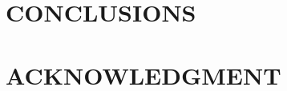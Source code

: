 \documentclass[letterpaper, 10 pt, conference]{ieeeconf}  %
\begin{document}
 
 
\section{CONCLUSIONS}


\addtolength{\textheight}{-12cm}   %








\section*{ACKNOWLEDGMENT}










\end{document}
